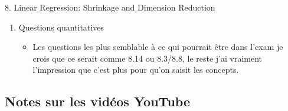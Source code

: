 \documentclass[12pt, titlepage, french]{report}
\begin{document}
\begin{CHPT_SUMM}{8. Linear Regression:  Shrinkage and Dimension Reduction}
\begin{enumerate}
	\begin{itemize}
		\item	Les questions d'exam semblaient être  +/- juste ça;
		\item	Bien saisir le lien avec le SSE et les différentes méthodes de régression;
		\item	Savoir et comprendre le lien entre le budget alloué $s$ et $\lambda$;
		\item	Savoir et comprendre la distinction entre PCA et PLS.
	\end{itemize}
	\item	Questions quantitatives
	\begin{itemize}
		\item	Les questions les plus semblable à ce qui pourrait être dans l'exam je crois que ce serait comme 8.14 ou 8.3/8.8, le reste j'ai vraiment l'impression que c'est plus pour qu'on saisit les concepts.
	\end{itemize}
\end{enumerate}
\end{CHPT_SUMM}

\subsection{Notes sur les vidéos YouTube}
\end{document}
